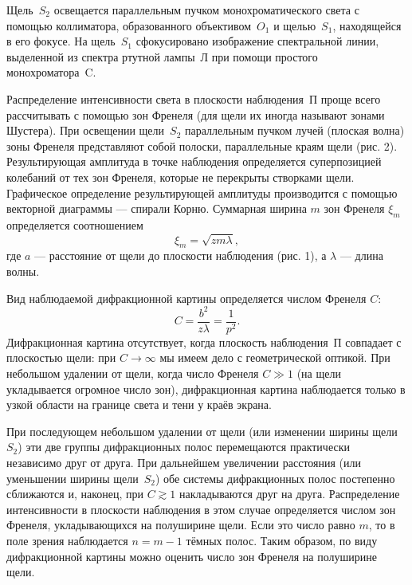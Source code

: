 \documentclass[a4paper, 12pt]{article}
\begin{document}
	Щель~$S_2$ освещается параллельным пучком монохроматического света с помощью коллиматора, образованного объективом~$O_1$ и щелью~$S_1$, находящейся в его фокусе. На щель~$S_1$ сфокусировано изображение спектральной линии, выделенной из спектра ртутной лампы~Л при помощи простого монохроматора~C.


	Распределение интенсивности света в плоскости наблюдения~П проще всего рассчитывать с помощью зон Френеля (для щели их иногда называют зонами Шустера). При освещении щели~$S_2$ параллельным пучком лучей (плоская волна) зоны Френеля представляют собой полоски, параллельные краям щели (рис. 2). Результирующая амплитуда в точке наблюдения определяется суперпозицией колебаний от тех зон Френеля, которые не перекрыты створками щели. Графическое определение результирующей амплитуды производится с помощью векторной диаграммы --- спирали Корню. Суммарная ширина $m$ зон Френеля $\xi_m$ определяется соотношением
	\begin{equation}
		\label{Ширина зон}
	\xi_m=\sqrt{zm\lambda},
	\end{equation}
	где $a$ --- расстояние от щели до плоскости наблюдения (рис. 1), а $\lambda$ --- длина волны.

	Вид наблюдаемой дифракционной картины определяется числом Френеля $C$:
	\begin{equation}
		C = \dfrac{b^2}{z \lambda} = \dfrac{1}{p^2}.
		\label{Число Френеля}
	\end{equation}
	Дифракционная картина отсутствует, когда плоскость наблюдения~П совпадает с плоскостью щели: при $C \rightarrow \infty$ мы имеем дело с геометрической оптикой. При небольшом удалении от щели, когда число Френеля $C \gg 1$ (на щели укладывается огромное число зон), дифракционная картина наблюдается только в узкой области на границе света и тени у краёв экрана.

	При последующем небольшом удалении от щели (или изменении ширины щели $S_2$) эти две группы дифракционных полос перемещаются практически независимо друг от друга. При дальнейшем увеличении расстояния (или уменьшении ширины щели~$S_2$) обе системы дифракционных полос постепенно сближаются и, наконец, при $C \gtrsim 1$ накладываются друг на друга. Распределение интенсивности в плоскости наблюдения в этом случае определяется числом зон Френеля, укладывающихся на полуширине щели. Если это число равно $m$, то в поле зрения наблюдается $n=m-1$ тёмных полос. Таким образом, по виду дифракционной картины можно оценить число зон Френеля на полуширине щели.
\end{document}
